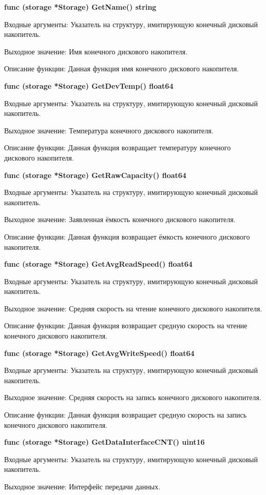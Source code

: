 \textbf{func (storage *Storage) GetName() string}

Входные аргументы: Указатель на структуру, имитирующую конечный дисковый накопитель.

Выходное значение: Имя конечного дискового накопителя.

Описание функции: Данная функция имя конечного дискового накопителя.

\textbf{func (storage *Storage) GetDevTemp() float64}

Входные аргументы: Указатель на структуру, имитирующую конечный дисковый накопитель.

Выходное значение: Температура конечного дискового накопителя.

Описание функции: Данная функция возвращает температуру конечного дискового накопителя.

\textbf{func (storage *Storage) GetRawCapacity() float64}

Входные аргументы: Указатель на структуру, имитирующую конечный дисковый накопитель.

Выходное значение: Заявленная ёмкость конечного дискового накопителя.

Описание функции: Данная функция возвращает ёмкость конечного дискового накопителя.

\textbf{func (storage *Storage) GetAvgReadSpeed() float64}

Входные аргументы: Указатель на структуру, имитирующую конечный дисковый накопитель.

Выходное значение: Средняя скорость на чтение конечного дискового накопителя.

Описание функции: Данная функция возвращает средную скорость на чтение конечного дискового накопителя.

\textbf{func (storage *Storage) GetAvgWriteSpeed() float64}

Входные аргументы: Указатель на структуру, имитирующую конечный дисковый накопитель.

Выходное значение: Средняя скорость на запись конечного дискового накопителя.

Описание функции: Данная функция возвращает средную скорость на запись конечного дискового накопителя.
 

\textbf{func (storage *Storage) GetDataInterfaceCNT() uint16}

Входные аргументы: Указатель на структуру, имитирующую конечный дисковый накопитель.

Выходное значение: Интерфейс передачи данных. 

